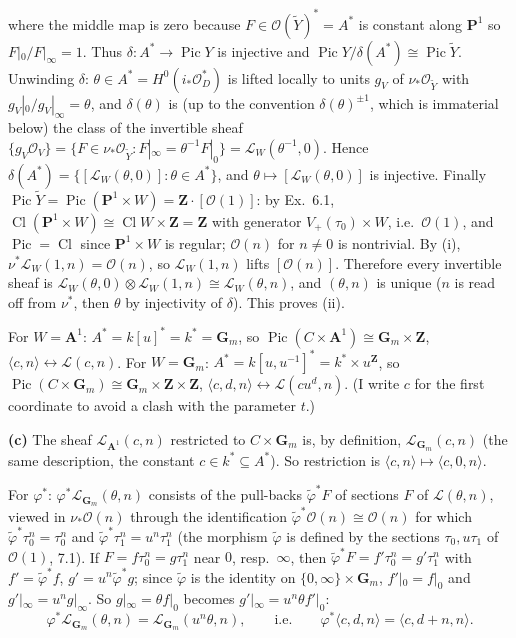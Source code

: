 \documentclass[11pt]{article}
\begin{document}
where the middle map is zero because $F\in\mathcal O(\tilde Y)^*=A^*$ is constant along $\mathbf P^1$ so $F|_0/F|_\infty=1$. Thus $\delta:A^*\to\operatorname{Pic}Y$ is injective and $\operatorname{Pic}Y/\delta(A^*)\cong\operatorname{Pic}\tilde Y$. Unwinding $\delta$: $\theta\in A^*=H^0(i_*\mathcal O_D^*)$ is lifted locally to units $g_V$ of $\nu_*\mathcal O_{\tilde Y}$ with $g_V|_0/g_V|_\infty=\theta$, and $\delta(\theta)$ is (up to the convention $\delta(\theta)^{\pm1}$, which is immaterial below) the class of the invertible sheaf $\{g_V\mathcal O_V\}=\{F\in\nu_*\mathcal O_{\tilde Y}:F|_\infty=\theta^{-1}F|_0\}=\mathcal L_W(\theta^{-1},0)$. Hence $\delta(A^*)=\{[\mathcal L_W(\theta,0)]:\theta\in A^*\}$, and $\theta\mapsto[\mathcal L_W(\theta,0)]$ is injective. Finally $\operatorname{Pic}\tilde Y=\operatorname{Pic}(\mathbf P^1\times W)=\mathbf Z\cdot[\mathcal O(1)]$: by Ex.~6.1, $\operatorname{Cl}(\mathbf P^1\times W)\cong\operatorname{Cl}W\times\mathbf Z=\mathbf Z$ with generator $V_+(\tau_0)\times W$, i.e.\ $\mathcal O(1)$, and $\operatorname{Pic}=\operatorname{Cl}$ since $\mathbf P^1\times W$ is regular; $\mathcal O(n)$ for $n\ne0$ is nontrivial. By (i), $\nu^*\mathcal L_W(1,n)=\mathcal O(n)$, so $\mathcal L_W(1,n)$ lifts $[\mathcal O(n)]$. Therefore every invertible sheaf is $\mathcal L_W(\theta,0)\otimes\mathcal L_W(1,n)\cong\mathcal L_W(\theta,n)$, and $(\theta,n)$ is unique ($n$ is read off from $\nu^*$, then $\theta$ by injectivity of $\delta$). This proves (ii).

For $W=\mathbf A^1$: $A^*=k[u]^*=k^*=\mathbf G_m$, so $\operatorname{Pic}(C\times\mathbf A^1)\cong\mathbf G_m\times\mathbf Z$, $\langle c,n\rangle\leftrightarrow\mathcal L(c,n)$. For $W=\mathbf G_m$: $A^*=k[u,u^{-1}]^*=k^*\times u^{\mathbf Z}$, so $\operatorname{Pic}(C\times\mathbf G_m)\cong\mathbf G_m\times\mathbf Z\times\mathbf Z$, $\langle c,d,n\rangle\leftrightarrow\mathcal L(cu^d,n)$. (I write $c$ for the first coordinate to avoid a clash with the parameter $t$.)

\textbf{(c)} The sheaf $\mathcal L_{\mathbf A^1}(c,n)$ restricted to $C\times\mathbf G_m$ is, by definition, $\mathcal L_{\mathbf G_m}(c,n)$ (the same description, the constant $c\in k^*\subseteq A^*$). So restriction is $\langle c,n\rangle\mapsto\langle c,0,n\rangle$.

For $\varphi^*$: $\varphi^*\mathcal L_{\mathbf G_m}(\theta,n)$ consists of the pull-backs $\tilde\varphi^*F$ of sections $F$ of $\mathcal L(\theta,n)$, viewed in $\nu_*\mathcal O(n)$ through the identification $\tilde\varphi^*\mathcal O(n)\cong\mathcal O(n)$ for which $\tilde\varphi^*\tau_0^n=\tau_0^n$ and $\tilde\varphi^*\tau_1^n=u^n\tau_1^n$ (the morphism $\tilde\varphi$ is defined by the sections $\tau_0,u\tau_1$ of $\mathcal O(1)$, 7.1). If $F=f\tau_0^n=g\tau_1^n$ near $0$, resp.\ $\infty$, then $\tilde\varphi^*F=f'\tau_0^n=g'\tau_1^n$ with $f'=\tilde\varphi^*f$, $g'=u^n\tilde\varphi^*g$; since $\tilde\varphi$ is the identity on $\{0,\infty\}\times\mathbf G_m$, $f'|_0=f|_0$ and $g'|_\infty=u^ng|_\infty$. So $g|_\infty=\theta f|_0$ becomes $g'|_\infty=u^n\theta f'|_0$:
\[
\varphi^*\mathcal L_{\mathbf G_m}(\theta,n)=\mathcal L_{\mathbf G_m}(u^n\theta,n),\qquad\text{i.e.}\qquad \varphi^*\langle c,d,n\rangle=\langle c,d+n,n\rangle .
\]
\end{document}
